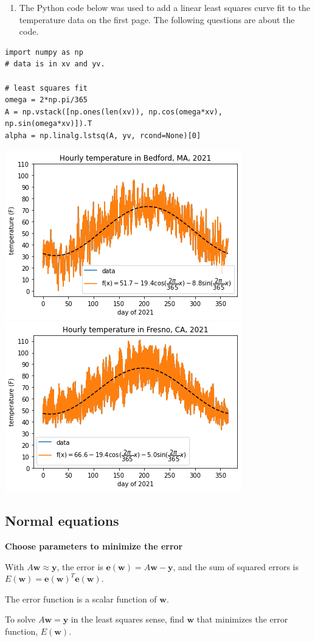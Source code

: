 \documentclass[12pt,letterpaper,noanswers]{exam}
\newcommand{\vc}[1]{\boldsymbol{#1}}
\begin{document}
\begin{enumerate}[resume=classQ]
    \item The Python code below was used to add a linear least squares curve fit to the temperature data on the first page.  The following questions are about the code.
\end{enumerate}
\begin{verbatim}
import numpy as np
# data is in xv and yv.

# least squares fit
omega = 2*np.pi/365
A = np.vstack([np.ones(len(xv)), np.cos(omega*xv), np.sin(omega*xv)]).T
alpha = np.linalg.lstsq(A, yv, rcond=None)[0]
\end{verbatim}

\includegraphics[width=0.45\linewidth]{img/C03weatherBedfordfit.png}
\includegraphics[width=0.45\linewidth]{img/C03weatherFresnofit.png}



\subsection{Normal equations}

\noindent\textbf{Choose parameters to minimize the error}
\begin{tcolorbox}
 With $A\vc{w} \approx \vc{y}$, the error is $\vc{e}(\vc{w}) = A\vc{w}-\vc{y}$, and the sum of squared errors is $E(\vc{w}) = \vc{e}(\vc{w})^T\vc{e}(\vc{w})$.
    
    The error function is a scalar function of $\vc{w}$.
\end{tcolorbox}
 To solve $A\vc{w} = \vc{y}$ in the least squares sense, find $\vc{w}$ that minimizes the error function, $E(\vc{w})$.
    
\end{document}
